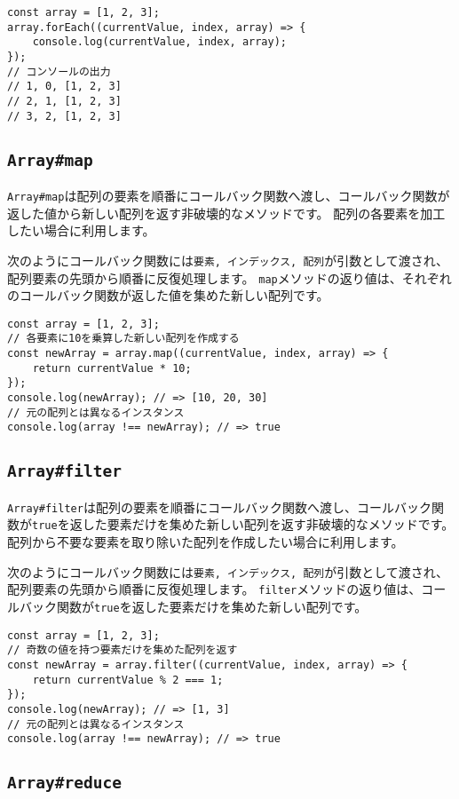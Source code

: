\begin{lstlisting}
const array = [1, 2, 3];
array.forEach((currentValue, index, array) => {
    console.log(currentValue, index, array);
});
// コンソールの出力
// 1, 0, [1, 2, 3]
// 2, 1, [1, 2, 3]
// 3, 2, [1, 2, 3]
\end{lstlisting}

\hypertarget{array-map}{%
\subsection{\texorpdfstring{\texttt{Array\#map}}{Array\#map}}\label{array-map}}

\texttt{Array\#map}は配列の要素を順番にコールバック関数へ渡し、コールバック関数が返した値から新しい配列を返す非破壊的なメソッドです。
配列の各要素を加工したい場合に利用します。

次のようにコールバック関数には\texttt{要素, インデックス, 配列}が引数として渡され、配列要素の先頭から順番に反復処理します。
\texttt{map}メソッドの返り値は、それぞれのコールバック関数が返した値を集めた新しい配列です。

\begin{lstlisting}
const array = [1, 2, 3];
// 各要素に10を乗算した新しい配列を作成する
const newArray = array.map((currentValue, index, array) => {
    return currentValue * 10;
});
console.log(newArray); // => [10, 20, 30]
// 元の配列とは異なるインスタンス
console.log(array !== newArray); // => true
\end{lstlisting}

\hypertarget{array-filter}{%
\subsection{\texorpdfstring{\texttt{Array\#filter}}{Array\#filter}}\label{array-filter}}

\texttt{Array\#filter}は配列の要素を順番にコールバック関数へ渡し、コールバック関数が\texttt{true}を返した要素だけを集めた新しい配列を返す非破壊的なメソッドです。
配列から不要な要素を取り除いた配列を作成したい場合に利用します。

次のようにコールバック関数には\texttt{要素, インデックス, 配列}が引数として渡され、配列要素の先頭から順番に反復処理します。
\texttt{filter}メソッドの返り値は、コールバック関数が\texttt{true}を返した要素だけを集めた新しい配列です。

\begin{lstlisting}
const array = [1, 2, 3];
// 奇数の値を持つ要素だけを集めた配列を返す
const newArray = array.filter((currentValue, index, array) => {
    return currentValue % 2 === 1;
});
console.log(newArray); // => [1, 3]
// 元の配列とは異なるインスタンス
console.log(array !== newArray); // => true
\end{lstlisting}
\vspace{-3mm}
\hypertarget{array-reduce}{%
\subsection{\texorpdfstring{\texttt{Array\#reduce}}{Array\#reduce}}\label{array-reduce}}


